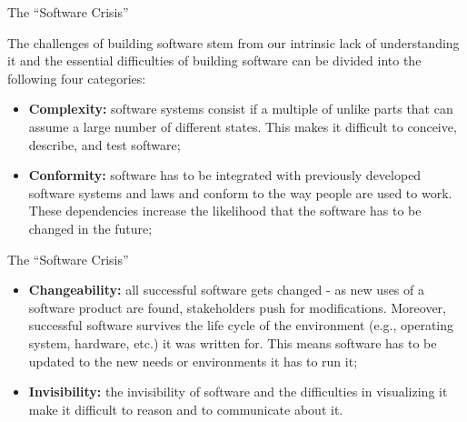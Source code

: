 \documentclass{beamer}
\begin{document}
\begin{frame}{\centerline{The ``Software Crisis''}}
The challenges of building software stem from our intrinsic lack of understanding it and the essential difficulties of building software can be divided into the following four categories:
\begin{itemize}
\item \textbf{Complexity:} software systems consist if a multiple of unlike parts that can assume a large number of different states. This makes it difficult to conceive, describe, and test software;

\item \textbf{Conformity:} software has to be integrated with previously developed software systems and laws and conform to the way people are used to work. These dependencies increase the likelihood that the software has to be changed in the future;
\end{itemize}

\end{frame}

\begin{frame}{\centerline{The ``Software Crisis''}}
\begin{itemize}
\item \textbf{Changeability:} all successful software gets changed - as new uses of a software product are found, stakeholders push for modifications. Moreover, successful software survives the life cycle of the environment (e.g., operating system, hardware, etc.) it was written for. This means software has to be updated to the new needs or environments it has to run it;

\item \textbf{Invisibility:} the invisibility of software and the difficulties in visualizing it make it difficult to reason and to communicate about it.
\end{itemize}
\end{frame}
\end{document}
